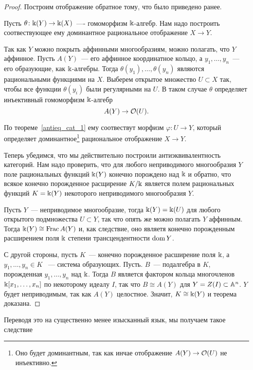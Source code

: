 	 \begin{proof}
	 	Построим отображение обратное тому, что было приведено ранее. 

	 	Пусть $\theta\colon \bk(Y) \to \bk(X)$~---- гомоморфизм $\bk$-алгебр. Нам надо построить соотвествующее ему доминантное рациональное отображение $X \to Y$. 

	 	Так как $Y$ можно покрыть аффинными многообразиям, можно полагать, что $Y$ аффинное. Пусть $A(Y)$~--- его аффинное координатное кольцо, а $y_1, \ldots, y_n$~--- его образующие, как $\bk$-алгебры. Тогда $\theta(y_1), \ldots, \theta(y_n)$ являются рациональными функциями на $X$. Выберем открытое множество $U \subset X$ так, чтобы все функции $\theta(y_i)$ были регулярными на $U$. В таком случае $\theta$ определяет инъективный гомоморфизм $\bk$-алгебр 
	 	\[
	 		A(Y) \to \cO(U). 
	 	\]

	 	По теореме~\ref{antieq_cat_1} ему соотвествут морфизм $\varphi\colon U \to Y$, который определяет доминантное\footnote{Оно будет доминантным, так как инчае отображение $A(Y) \to \cO(U)$ не инъективно. } рациональное отображение $X \to Y$. 

	 	Теперь убедимся, что мы действительно построили антиэквивалентность категорий. Нам надо проверить, что для любого неприводимого многообразия $Y$ поле рациональных функций $\bk(Y)$ конечно порождено над $\bk$ и обратно, что всякое конечно порожденное расщирение $K/\bk$ является полем рациональных функций $K = \bk(Y)$ некоторого неприводимого многообразия $Y$.

	 	Пусть $Y$~--- неприводимое многообразие, тогда $\bk(Y) = \bk(U)$ для любого открытого подмножества $U \subset Y$, так что опять же можно полагать $Y$ аффинным.  Тогда $\bk(Y) \cong \Frac{A(Y)}$ и, как следствие, оно являетя конечно порожденным расширением поля $\bk$ степени трансцендентности $\dom{Y}$. 

	 	С другой стороны, пусть $K$~--- конечно порожденное расширение поля $\bk$, а $y_1, \ldots, y_n \in K$ ~--- система образующих. Пусть. $B$~--- подалгебра в $K$, порожденная $y_1, \ldots, y_n$ над $\bk$. Тогда $B$ является фактором кольца многочленов $\bk[x_1, \ldots, x_n]$ по некоторому идеалу $I$, так что $B \cong A(Y)$ для $Y = Z(I) \subset \AA^n$. $Y$ будет неприводимым, так как $A(Y)$ целостное. Значит, $K \cong \bk(Y)$ и теорема доказана. 
	 \end{proof}

    Переводя это на существенно менее изысканный язык, мы получаем такое следствие 

